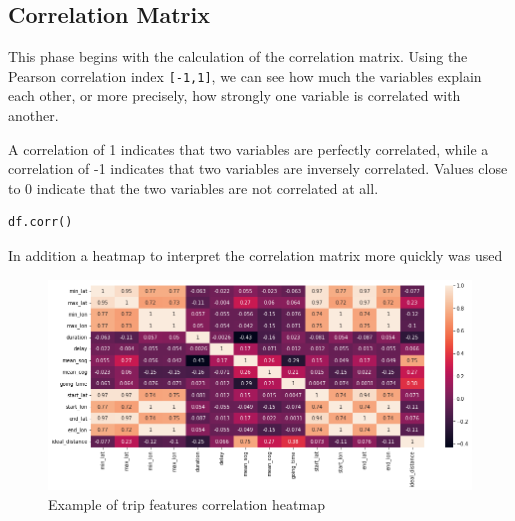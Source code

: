 \subsection{Correlation Matrix}

This phase begins with the calculation of the correlation matrix. Using the Pearson correlation index \verb|[-1,1]|, we can see how much the variables explain each other, or more precisely, how strongly one variable is correlated with another.

A correlation of 1 indicates that two variables are perfectly correlated, while a correlation of -1 indicates that two variables are inversely correlated. Values close to 0 indicate that the two variables are not correlated at all.

\begin{lstlisting}[language=Python]
df.corr()
\end{lstlisting}

In addition a heatmap to interpret the correlation matrix more quickly was used

\begin{figure}[H]
    \centering
    \includegraphics[width=17cm]{Images/1/heatmap.png}
    \caption{Example of trip features correlation heatmap}
\end{figure}

